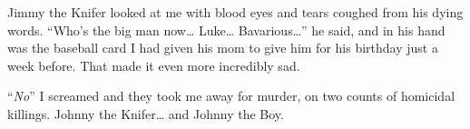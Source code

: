 Jimmy the Knifer looked at me with blood eyes and tears coughed
from his dying words. ``Who's the big man now{\ldots} Luke{\ldots}
Bavarious{\ldots}'' he said, and in his hand was the baseball card I had
given his mom to give him for his birthday just a week before. That
made it even more incredibly sad.



``{\em No}'' I screamed and they took me away for murder, on two counts of
homicidal killings. Johnny the Knifer{\ldots} and Johnny the Boy. 

 







